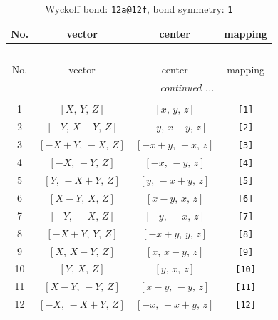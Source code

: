 \documentclass[fleqn,8pt]{jsarticle}
\begin{document}
\begin{longtable}{cccc}
\caption{Wyckoff bond: {\tt 12a@12f}, bond symmetry: {\tt 1}}
 \\
 \hline \hline
No. & vector & center & mapping \\ \hline \endfirsthead

\multicolumn{3}{l}{\tablename\ \thetable{}} \\
 \hline \hline
No. & vector & center & mapping \\ \hline \endhead

 \hline \hline
\multicolumn{3}{r}{\footnotesize\it continued ...} \\ \endfoot

 \hline \hline
\multicolumn{3}{r}{} \\ \endlastfoot

1 & $\left[ X,\, Y,\, Z \right]$ & $\left[ x,\, y,\, z \right]$ & {\tt [1]} \\ \hline
2 & $\left[ - Y,\, X - Y,\, Z \right]$ & $\left[ - y,\, x - y,\, z \right]$ & {\tt [2]} \\ \hline
3 & $\left[ - X + Y,\, - X,\, Z \right]$ & $\left[ - x + y,\, - x,\, z \right]$ & {\tt [3]} \\ \hline
4 & $\left[ - X,\, - Y,\, Z \right]$ & $\left[ - x,\, - y,\, z \right]$ & {\tt [4]} \\ \hline
5 & $\left[ Y,\, - X + Y,\, Z \right]$ & $\left[ y,\, - x + y,\, z \right]$ & {\tt [5]} \\ \hline
6 & $\left[ X - Y,\, X,\, Z \right]$ & $\left[ x - y,\, x,\, z \right]$ & {\tt [6]} \\ \hline
7 & $\left[ - Y,\, - X,\, Z \right]$ & $\left[ - y,\, - x,\, z \right]$ & {\tt [7]} \\ \hline
8 & $\left[ - X + Y,\, Y,\, Z \right]$ & $\left[ - x + y,\, y,\, z \right]$ & {\tt [8]} \\ \hline
9 & $\left[ X,\, X - Y,\, Z \right]$ & $\left[ x,\, x - y,\, z \right]$ & {\tt [9]} \\ \hline
10 & $\left[ Y,\, X,\, Z \right]$ & $\left[ y,\, x,\, z \right]$ & {\tt [10]} \\ \hline
11 & $\left[ X - Y,\, - Y,\, Z \right]$ & $\left[ x - y,\, - y,\, z \right]$ & {\tt [11]} \\ \hline
12 & $\left[ - X,\, - X + Y,\, Z \right]$ & $\left[ - x,\, - x + y,\, z \right]$ & {\tt [12]} \\
\end{longtable}
\end{document}
